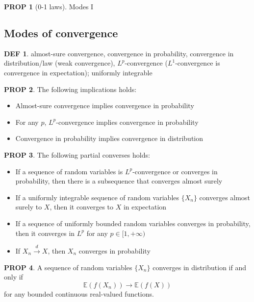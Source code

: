 \documentclass[hidelinks,11pt]{article}
\theoremstyle{definition}
\newtheorem*{defin}{DEF}
\theoremstyle{dotles}
\theoremstyle{dotless}
\newtheorem{prop}{PROP}[section]
\theoremstyle{remark}
\begin{document}
\begin{prop}[0-1 laws]
Modes I
\end{prop}

\subsection{Modes of convergence}

\begin{defin}
almost-sure convergence, convergence in probability, convergence in distribution/law (weak convergence), $L^p$-convergence ($L^1$-convergence is convergence in expectation); uniformly integrable
\end{defin}

\begin{prop}\label{2.9}
The following implications holds:\begin{itemize}
    \item Almost-sure convergence implies convergence in probability
    \item For any $p$, $L^p$-convergence implies convergence in probability
    \item Convergence in probability implies convergence in distribution
\end{itemize}
\end{prop}

\begin{prop}
The following partial converses holds:\begin{itemize}
    \item If a sequence of random variables is $L^p$-convergence or converges in probability, then there is a subsequence that converges almost surely
    \item If a uniformly integrable sequence of random variables $\{X_n\}$ converges almost surely to $X$, then it converges to $X$ in expectation
    \item If a sequence of uniformly bounded random variables converges in probability, then it converges in $L^p$ for any $p\in[1,+\infty)$
    \item If $X_n\xrightarrow{d}X$, then $X_n$ converges in probability 
\end{itemize}
\end{prop}

\begin{prop}
A sequence of random variables $\{X_n\}$ converges in distribution if and only if 
\[\mathbb{E}(f(X_n))\to\mathbb{E}(f(X))\]
for any bounded continuous real-valued functions.
\end{prop}
\end{document}
